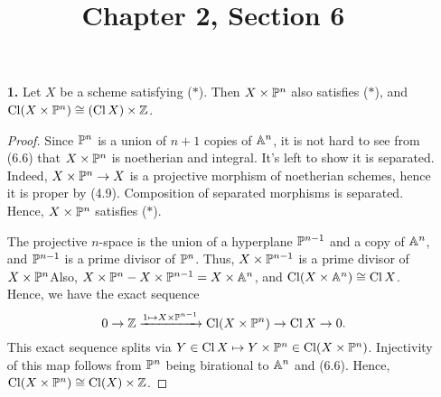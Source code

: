 \documentclass{article}
\title{Chapter 2, Section 6}
\begin{document}
\maketitle
\begin{enumerate} [label=\textbf{\arabic*.}, leftmargin=0em]

\item[\textbf{1.}] Let $X$ be a scheme satisfying ($*$). Then $X \times \mathbb{P}^n$ also satisfies ($*$), and $\operatorname{Cl} (X \times \mathbb{P}^n) \cong (\operatorname{Cl} X) \times \mathbb{Z}$.

\begin{proof}
    Since $\mathbb{P}^n$ is a union of $n+1$ copies of $\mathbb{A}^n$, it is not hard to see from (6.6) that $X \times \mathbb{P}^n$ is noetherian and integral. It's left to show it is separated. Indeed, $X \times \mathbb{P}^n \to X$ is a projective morphism of noetherian schemes, hence it is proper by (4.9). Composition of separated morphisms is separated. Hence, $X \times \mathbb{P}^n$ satisfies ($*$).

    The projective $n$-space is the union of a hyperplane $\mathbb{P}^{n - 1}$ and a copy of $\mathbb{A}^n$, and $\mathbb{P}^{n - 1}$ is a prime divisor of $\mathbb{P}^n$. Thus, $X \times \mathbb{P}^{n-1}$ is a prime divisor of $X \times \mathbb{P}^n$Also, $X \times \mathbb{P}^n - X \times \mathbb{P}^{n-1} = X \times \mathbb{A}^n$, and $\operatorname{Cl}(X \times \mathbb{A}^n) \cong \operatorname{Cl}{X}$. Hence, we have the exact sequence
    \begin{equation*}
        0 \to \mathbb{Z} \xrightarrow{1 \mapsto X \times \mathbb{P}^{n-1}} \operatorname{Cl}(X \times \mathbb{P}^n) \to \operatorname{Cl}{X} \to 0.
    \end{equation*} 
    This exact sequence splits via $Y \in \operatorname{Cl}{X} \mapsto Y \times \mathbb{P}^n \in \operatorname{Cl}(X \times \mathbb{P}^n)$. Injectivity of this map follows from $\mathbb{P}^n$ being birational to $\mathbb{A}^n$ and (6.6). Hence, $\operatorname{Cl}(X \times \mathbb{P}^n) \cong \operatorname{Cl}(X) \times \mathbb{Z}$.
\end{proof}


\end{enumerate}
\end{document}
